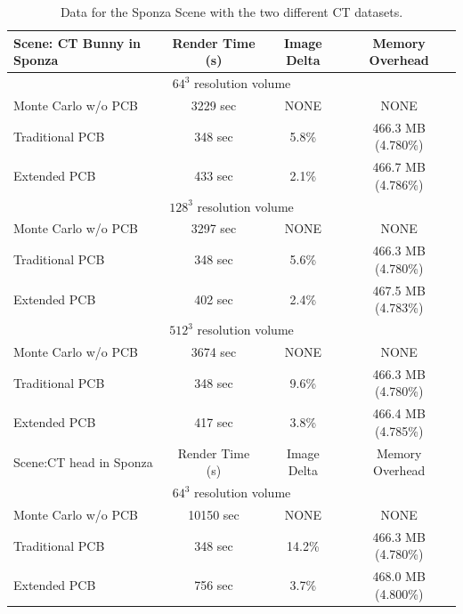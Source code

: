 \documentclass[runningheads]{llncs}
\begin{document}
\setlength{\tabcolsep}{4pt}
\begin{table}
\begin{center}
\caption{Data for the Sponza Scene with the two different CT datasets.}
\label{tb:compare}
\begin{tabular}[b]{ | l | c | c | c | }
  \hline                       
  Scene: CT Bunny in Sponza & Render Time (s) & Image Delta & Memory Overhead \\

  \hline
  \multicolumn{4}{|c|}{$64^3$ resolution volume} \\     
  \hline            

  Monte Carlo w/o PCB & 3229 sec & NONE & NONE \\
  Traditional PCB & 348 sec & 5.8\% & 466.3 MB (4.780\%) \\
  Extended PCB & 433 sec & 2.1\% & 466.7 MB (4.786\%)  \\

  \hline
  \multicolumn{4}{|c|}{$128^3$ resolution volume} \\     
  \hline            
             
  Monte Carlo w/o PCB & 3297 sec & NONE & NONE \\
  Traditional PCB & 348 sec & 5.6\% & 466.3 MB (4.780\%) \\
  Extended PCB & 402 sec & 2.4\% & 467.5 MB (4.783\%)  \\

  \hline
  \multicolumn{4}{|c|}{$512^3$ resolution volume} \\     
  \hline            
             
  Monte Carlo w/o PCB & 3674 sec & NONE & NONE \\
  Traditional PCB & 348 sec & 9.6\% & 466.3 MB (4.780\%) \\
  Extended PCB & 417 sec & 3.8\% & 466.4 MB (4.785\%)  \\
  \hline  
  \hline  
             
  Scene:CT head in Sponza & Render Time (s) & Image Delta & Memory Overhead \\

  \hline
  \multicolumn{4}{|c|}{$64^3$ resolution volume} \\     
  \hline            

  Monte Carlo w/o PCB & 10150 sec & NONE & NONE \\
  Traditional PCB & 348 sec & 14.2\% & 466.3 MB (4.780\%) \\
  Extended PCB & 756 sec & 3.7\% & 468.0 MB (4.800\%)  \\


\end{tabular}
\end{center}
\end{table}
\end{document}
